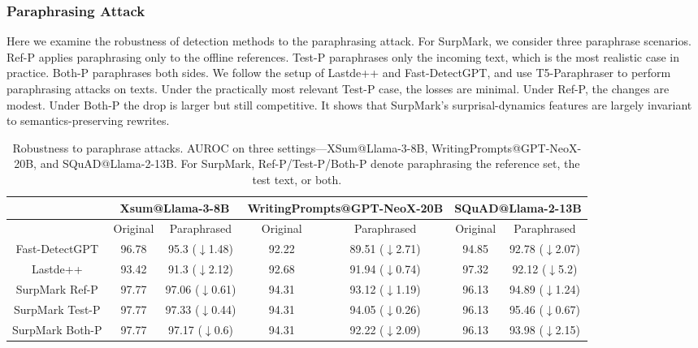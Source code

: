 \documentclass{article}
\theoremstyle{plain}
\theoremstyle{definition}
\theoremstyle{remark}
\begin{document}
\subsubsection{Paraphrasing Attack} \label{sec:paraphrasing-attack}
Here we examine the robustness of detection methods to the paraphrasing attack. For SurpMark, we consider three paraphrase scenarios. Ref-P applies paraphrasing only to the offline references. Test-P paraphrases only the incoming text, which is the most realistic case in practice. Both-P paraphrases both sides. We follow the setup of Lastde++ and Fast-DetectGPT, and use T5-Paraphraser to perform paraphrasing attacks on texts. Under the practically most relevant Test-P case, the losses are minimal. Under Ref-P, the changes are modest. Under Both-P the drop is larger but still competitive. It shows that SurpMark’s surprisal-dynamics features are largely invariant to semantics-preserving rewrites.
\begin{table}[htbp]
{\scriptsize
    \centering
    \begin{tabular}{ccc|cc|cc}
    \toprule
    & \multicolumn{2}{c}{Xsum@Llama-3-8B}& \multicolumn{2}{c}{WritingPrompts@GPT-NeoX-20B}& \multicolumn{2}{c}{SQuAD@Llama-2-13B} \\
    \midrule
        & Original & Paraphrased & Original & Paraphrased& Original & Paraphrased \\
        \midrule
      Fast-DetectGPT  & 96.78& 95.3 ($\downarrow$1.48)&92.22&89.51 ($\downarrow$2.71)&94.85&92.78 ($\downarrow$2.07)\\
      Lastde++  & 93.42 &  91.3 ($\downarrow$2.12)&92.68&91.94 ($\downarrow$0.74)&97.32&92.12 ($\downarrow$5.2)\\
      SurpMark Ref-P   & 97.77 & 97.06 ($\downarrow$0.61)&94.31&93.12 ($\downarrow$1.19)&96.13& 94.89 ($\downarrow$1.24)\\
      SurpMark Test-P   &97.77 & 97.33 ($\downarrow$0.44)&94.31&94.05 ($\downarrow$0.26)&96.13&95.46 ($\downarrow$0.67)\\
      SurpMark Both-P   & 97.77 &97.17 ($\downarrow$0.6)&94.31&92.22 ($\downarrow$2.09)&96.13&93.98 ($\downarrow$2.15)\\
         \bottomrule
    \end{tabular}
    \caption{Robustness to paraphrase attacks. AUROC on three settings—XSum@Llama-3-8B, WritingPrompts@GPT-NeoX-20B, and SQuAD@Llama-2-13B. For SurpMark, Ref-P/Test-P/Both-P denote paraphrasing the reference set, the test text, or both.}}
    \label{tab:paraphrase-attack}
\end{table}
\end{document}
